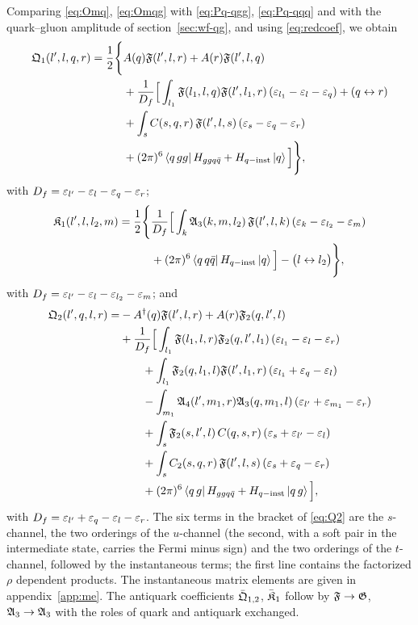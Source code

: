 Comparing \eqref{eq:Omq}, \eqref{eq:Omqg} with \eqref{eq:Pq-qgg}, \eqref{eq:Pq-qqq} and with the
quark--gluon amplitude of section~\ref{sec:wf-qg}, and using \eqref{eq:redcoef}, we obtain
\begin{align}
\mathfrak{Q}_{1}(l',l,q,r)=\frac12\Bigg\{&A(q)\mathfrak{F}(l',l,r)+A(r)\mathfrak{F}(l',l,q)
\nonumber\\&+\frac{1}{D_{f}}\Big[\int_{l_{1}}\mathfrak{F}(l_{1},l,q)\mathfrak{F}(l',l_{1},r)\,(\varepsilon_{l_{1}}-\varepsilon_{l}-\varepsilon_{q})+(q\leftrightarrow r)
\nonumber\\
&+\int_{s}C(s,q,r)\,\mathfrak{F}(l',l,s)\,(\varepsilon_{s}-\varepsilon_{q}-\varepsilon_{r})
\nonumber\\&+(2\pi)^{6}\left\langle q\,gg\right|H_{ggq\bar q}+H_{q-{\rm inst}}\left|q\right\rangle\Big]\Bigg\},
\label{eq:Q1}
\end{align}
with $D_{f}=\varepsilon_{l'}-\varepsilon_{l}-\varepsilon_{q}-\varepsilon_{r}$;
\begin{align}
\mathfrak{K}_{1}(l',l,l_{2},m)=\frac12\Bigg\{&\frac{1}{D_{f}}\Big[\int_{k}\mathfrak{A}_{3}(k,m,l_{2})\,\mathfrak{F}(l',l,k)\,(\varepsilon_{k}-\varepsilon_{l_{2}}-\varepsilon_{m})
\nonumber\\&+(2\pi)^{6}\left\langle q\,q\bar q\right|H_{q-{\rm inst}}\left|q\right\rangle\Big]-\big(l\leftrightarrow l_{2}\big)\Bigg\},
\label{eq:K1}
\end{align}
with $D_{f}=\varepsilon_{l'}-\varepsilon_{l}-\varepsilon_{l_{2}}-\varepsilon_{m}$; and
\begin{align}
\mathfrak{Q}_{2}(l',q,l,r)=&-A^{\dagger}(q)\mathfrak{F}(l',l,r)+A(r)\mathfrak{F}_{2}(q,l',l)
\nonumber\\
&+\frac{1}{D_{f}}\Big[\int_{l_{1}}\mathfrak{F}(l_{1},l,r)\mathfrak{F}_{2}(q,l',l_{1})\,(\varepsilon_{l_{1}}-\varepsilon_{l}-\varepsilon_{r})
\nonumber\\&\qquad+\int_{l_{1}}\mathfrak{F}_{2}(q,l_{1},l)\mathfrak{F}(l',l_{1},r)\,(\varepsilon_{l_{1}}+\varepsilon_{q}-\varepsilon_{l})
\nonumber\\
&\qquad-\int_{m_{1}}\mathfrak{A}_{4}(l',m_{1},r)\mathfrak{A}_{3}(q,m_{1},l)\,(\varepsilon_{l'}+\varepsilon_{m_{1}}-\varepsilon_{r})
\nonumber\\&\qquad+\int_{s}\mathfrak{F}_{2}(s,l',l)\,C(q,s,r)\,(\varepsilon_{s}+\varepsilon_{l'}-\varepsilon_{l})
\nonumber\\
&\qquad+\int_{s}C_{2}(s,q,r)\,\mathfrak{F}(l',l,s)\,(\varepsilon_{s}+\varepsilon_{q}-\varepsilon_{r})
\nonumber\\&\qquad+(2\pi)^{6}\left\langle q\,g\right|H_{ggq\bar q}+H_{q-{\rm inst}}\left|q\,g\right\rangle\Big],
\label{eq:Q2}
\end{align}
with $D_{f}=\varepsilon_{l'}+\varepsilon_{q}-\varepsilon_{l}-\varepsilon_{r}$. The six terms in the bracket of \eqref{eq:Q2} are the
$s$-channel, the two orderings of the $u$-channel (the second, with a soft pair in the intermediate
state, carries the Fermi minus sign) and the two orderings of the $t$-channel, followed by the
instantaneous terms; the first line contains the factorized $\rho$ dependent products. The
instantaneous matrix elements are given in appendix~\ref{app:me}. The antiquark coefficients
$\bar{\mathfrak{Q}}_{1,2}$, $\bar{\mathfrak{K}}_{1}$ follow by $\mathfrak{F}\to\mathfrak{G}$, $\mathfrak{A}_{3}\to\mathfrak{A}_{3}$ with the roles of
quark and antiquark exchanged.

